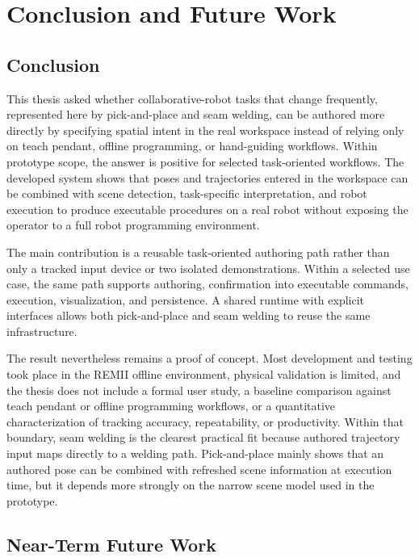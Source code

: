 \chapter{Conclusion and Future Work} \label{chapter:ch7_conclusion}

\section{Conclusion}

This thesis asked whether collaborative-robot tasks that change frequently, represented here by pick-and-place and seam welding, can be authored more directly by specifying spatial intent in the real workspace instead of relying only on teach pendant, offline programming, or hand-guiding workflows. Within prototype scope, the answer is positive for selected task-oriented workflows. The developed system shows that poses and trajectories entered in the workspace can be combined with scene detection, task-specific interpretation, and robot execution to produce executable procedures on a real robot without exposing the operator to a full robot programming environment.

The main contribution is a reusable task-oriented authoring path rather than only a tracked input device or two isolated demonstrations. Within a selected use case, the same path supports authoring, confirmation into executable commands, execution, visualization, and persistence. A shared runtime with explicit interfaces allows both pick-and-place and seam welding to reuse the same infrastructure.

The result nevertheless remains a proof of concept. Most development and testing took place in the REMII offline environment, physical validation is limited, and the thesis does not include a formal user study, a baseline comparison against teach pendant or offline programming workflows, or a quantitative characterization of tracking accuracy, repeatability, or productivity. Within that boundary, seam welding is the clearest practical fit because authored trajectory input maps directly to a welding path. Pick-and-place mainly shows that an authored pose can be combined with refreshed scene information at execution time, but it depends more strongly on the narrow scene model used in the prototype.

\section{Near-Term Future Work}

